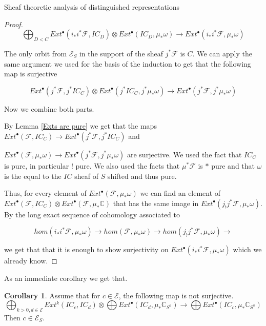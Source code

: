\documentclass[12pt]{article}
\newcommand{\C}{\mathbb{C}}
\newcommand{\<}{\langle}
\renewcommand{\>}{\rangle}
\theoremstyle{plain}
\theoremstyle{definition}
\newtheorem{cor}[theorem]{Corollary}
\begin{document}
\begin{section}{Sheaf theoretic analysis of distinguished representations}
\begin{proof}
    $$\bigoplus_{D<C}Ext^{\bullet}(i_*i^*\mathcal{F},IC_D)\otimes Ext^\bullet(IC_D,\mu_*\omega)\rightarrow Ext^\bullet(i_*i^*\mathcal{F},\mu_*\omega)$$ 



    

    The only orbit from $\mathcal{E}_S$ in the support of the sheaf $j^*\mathcal{F}$ is $C$. We can apply the same argument we used for the basis of the induction to get that the following map is surjective
    
    $$Ext^{\bullet}(j^*\mathcal{F},j^*IC_C)\otimes Ext^\bullet(j^*IC_C,j^*\mu_*\omega)\rightarrow Ext^\bullet(j^*\mathcal{F},j^*\mu_*\omega)$$ 

    Now we combine both parts. 

    By Lemma \ref{Exts are pure} we get that the maps $Ext^{\bullet}(\mathcal{F},IC_C)\rightarrow Ext^{\bullet}(j^*\mathcal{F},j^*IC_C)$ and
    
    $Ext^{\bullet}(\mathcal{F},\mu_*\omega)\rightarrow Ext^{\bullet}(j^*\mathcal{F},j^*\mu_*\omega)$ are surjective. We used the fact that $IC_C$ is pure, in particular ! pure. We also used the facts that $\mu^*\mathcal{F}$ is $*$ pure and that $\omega$ is the equal to the $IC$ sheaf of $S$ shifted and thus pure.

    Thus, for every element of $Ext^\bullet(\mathcal{F},\mu_*\omega)$ we can find an element of $Ext^{\bullet}(\mathcal{F},IC_C)\otimes Ext^{\bullet}(\mathcal{F},\mu_*\C)$ that has the same image in $Ext^\bullet(j_!j^*\mathcal{F},\mu_*\omega)$. By the long exact sequence of cohomology associated to 
    
    $$hom(i_*i^*\mathcal{F},\mu_*\omega)\rightarrow hom(\mathcal{F},\mu_*\omega) \rightarrow hom(j_!j^*\mathcal{F},\mu_*\omega) \rightarrow$$
    
    we get that that it is enough to show surjectivity on $Ext^\bullet(i_*i^*\mathcal{F},\mu_*\omega)$ which we already know.
\end{proof}

As an immediate corollary we get that.

\begin{cor}\label{MOS condition}
    Assume that for $c\in\mathcal{E}$, the following map is not surjective. $$\bigoplus_{k>0,d\in\mathcal{E}}Ext^k(IC_c,IC_d)\otimes \bigoplus Ext^{\bullet}(IC_d,\mu_*\C_{S^a})\rightarrow\bigoplus Ext^\bullet(IC_c,\mu_*\C_{S^a})$$ Then $c\in \mathcal{E}_S$.
\end{cor}


\end{section}
\end{document}

